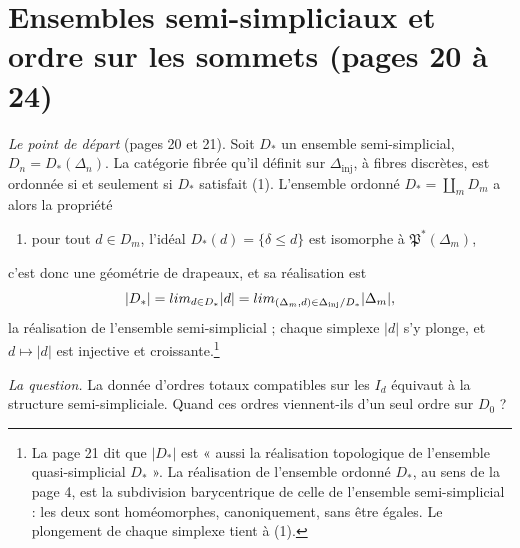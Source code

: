 \documentclass[11pt,a4paper]{article}
\begin{document}
\section*{Ensembles semi-simpliciaux et ordre sur les sommets (pages 20 à 24)}

\emph{Le point de départ} (pages 20 et 21). Soit $D_*$ un ensemble
semi-simplicial, $D_n = D_*(\Delta_n)$. La catégorie fibrée qu'il définit sur
$\Delta_{\mathrm{inj}}$, à fibres discrètes, est ordonnée si et seulement si
$D_*$ satisfait (1). L'ensemble ordonné $D_* = \coprod_m D_m$ a alors la
propriété
\begin{enumerate}
  \item[(a)] pour tout $d \in D_m$, l'idéal $D_*(d) = \{\delta \leqslant d\}$
  est isomorphe à $\mathfrak{P}^*(\Delta_m)$,
\end{enumerate}
c'est donc une géométrie de drapeaux, et sa réalisation est
\[
  |D_*| = \varinjlim_{d \in D_*} |d| = \varinjlim_{(\Delta_m, d) \in
  \Delta_{\mathrm{inj}}/D_*} |\Delta_m| ,
\]
la réalisation de l'ensemble semi-simplicial ; chaque simplexe $|d|$ s'y
plonge, et $d \mapsto |d|$ est injective et croissante.\footnote{La page 21
dit que $|D_*|$ est « aussi la réalisation topologique de l'ensemble
quasi-simplicial $D_*$ ». La réalisation de l'ensemble ordonné $D_*$, au sens
de la page 4, est la subdivision barycentrique de celle de l'ensemble
semi-simplicial : les deux sont homéomorphes, canoniquement, sans être
égales. Le plongement de chaque simplexe tient à (1).}

\emph{La question.} La donnée d'ordres totaux compatibles sur les $I_d$
équivaut à la structure semi-simpliciale. Quand ces ordres viennent-ils d'un
seul ordre sur $D_0$ ?
\end{document}
